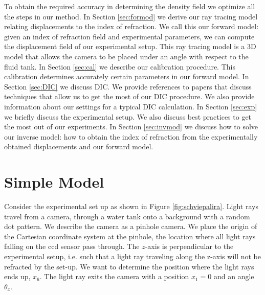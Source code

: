 \documentclass[draft]{svjour3}                     %
\begin{document}
To obtain the required accuracy in determining the density field we optimize all the steps in our method. In Section \ref{sec:formod} we derive our ray tracing model relating displacements to the index of refraction. We call this our forward model: given an index of refraction field and experimental parameters, we can compute the displacement field of our experimental setup. This ray tracing model is a 3D model that allows the camera to be placed under an angle with respect to the fluid tank. In Section \ref{sec:cal} we describe our calibration procedure. This calibration determines accurately certain parameters in our forward model.  In Section \ref{sec:DIC} we discuss DIC. We provide references to papers that discuss techniques that allow us to get the most of our DIC procedure. We also provide information about our settings for a typical DIC calculation. In Section \ref{sec:exp} we briefly discuss the experimental setup. We also discuss best practices to get the most out of our experiments. In Section \ref{sec:invmod} we discuss how to solve our inverse model: how to obtain the index of refraction from the experimentally obtained displacements and our forward model. 

\section{Simple Model}
\label{sec:simmod}
Consider the experimental set up as shown in Figure \ref{fig:schviepalira}. Light rays travel from a camera, through a water tank onto a background with a random dot pattern.  We describe the camera as a pinhole camera. We place the origin of the Cartesian coordinate system at the pinhole, the location where all light rays falling on the ccd sensor pass through. The $z$-axis is perpendicular to the experimental setup, i.e. such that a light ray traveling along the z-axis will not be refracted by the set-up. We want to determine the position where the light rays ends up, $x_6$. The light ray exits the camera with a position $x_1 = 0$ and an angle $\theta_x$. %

%	
\end{document}
